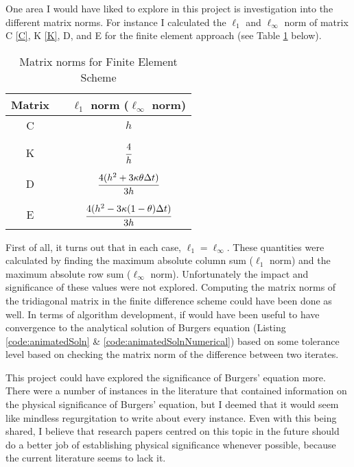 \documentclass[undefended]{sfuthesis}
\begin{document}
One area I would have liked to explore in this project is investigation into the different matrix norms. For instance I calculated the $\ell_1$ and $\ell_{\infty}$ norm of matrix C \eqref{C}, K \eqref{K}, D, and E for the finite element approach (see Table \ref{tab:norms} below).
\begin{table}[!h]%
	\centering
	\begin{threeparttable}
		\caption{Matrix norms for Finite Element Scheme}
		\label{tab:norms}
		\begin{tabular}{c p{.2\linewidth} c}
			\toprule
			Matrix && $\ell_1$ norm ($\ell_{\infty}$ norm)\\
			\midrule
			C && $h$ \\
			\vspace{0.05cm}&&\\
			K && $\cfrac{4}{h}$ \\
			\vspace{0.05cm}&&\\
			D && $\cfrac{4(h^2 + 3\kappa \theta \Delta t)}{3h}$ \\
			\vspace{0.05cm}&&\\
			E && $\cfrac{4(h^2 - 3\kappa (1 - \theta ) \Delta t)}{3h}$ \\
			\bottomrule
		\end{tabular}
	\end{threeparttable}
\end{table}
First of all, it turns out that in each case, $\ell_1 = \ell_{\infty}.$ These quantities were calculated by finding the maximum absolute column sum ($\ell_1$ norm) and the maximum absolute row sum ($\ell_{\infty}$ norm). Unfortunately the impact and significance of these values were not explored. Computing the matrix norms of the tridiagonal matrix in the finite difference scheme could have been done as well. In terms of algorithm development, if would have been useful to have convergence to the analytical solution of Burgers equation (Listing \ref{code:animatedSoln} \& \ref{code:animatedSolnNumerical}) based on some tolerance level based on checking the matrix norm of the difference between two iterates.

This project could have explored the significance of Burgers' equation more. There were a number of instances in the literature that contained information on the physical significance of Burgers' equation, but I deemed that it would seem like mindless regurgitation to write about every instance. Even with this being shared, I believe that research papers centred on this topic in the future should do a better job of establishing physical significance whenever possible, because the current literature seems to lack it.
\end{document}
